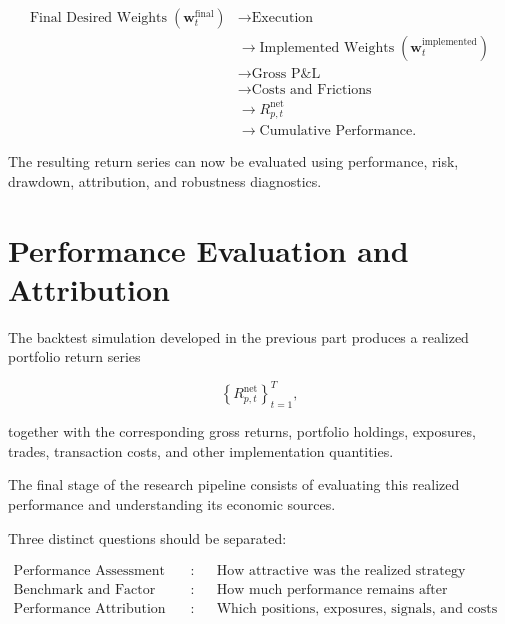 \documentclass[11pt,a4paper]{article}
\begin{document}
\begin{equation}
\boxed{
\begin{aligned}
\text{Final Desired Weights}
\;(\mathbf{w}_t^{\mathrm{final}})
&\rightarrow
\text{Execution}
\\
&\rightarrow
\text{Implemented Weights}
\;(\mathbf{w}_t^{\mathrm{implemented}})
\\
&\rightarrow
\text{Gross P\&L}
\\
&\rightarrow
\text{Costs and Frictions}
\\
&\rightarrow
R_{p,t}^{\mathrm{net}}
\\
&\rightarrow
\text{Cumulative Performance}.
\end{aligned}
}
\end{equation}

The resulting return series can now be evaluated using performance, risk,
drawdown, attribution, and robustness diagnostics.

\part{Performance Evaluation and Attribution}
\label{part:performance_evaluation_attribution}

The backtest simulation developed in the previous part produces a realized
portfolio return series

\begin{equation}
\left\{
R_{p,t}^{\mathrm{net}}
\right\}_{t=1}^{T},
\end{equation}

together with the corresponding gross returns, portfolio holdings, exposures,
trades, transaction costs, and other implementation quantities.

The final stage of the research pipeline consists of evaluating this realized
performance and understanding its economic sources.

Three distinct questions should be separated:

\begin{equation}
\boxed{
\begin{aligned}
\text{Performance Assessment}
&:
&&
\text{How attractive was the realized strategy performance?}
\\
\text{Benchmark and Factor Adjustment}
&:
&&
\text{How much performance remains after controlling for known risks?}
\\
\text{Performance Attribution}
&:
&&
\text{Which positions, exposures, signals, and costs generated the result?}
\end{aligned}
}
\end{equation}
\end{document}
